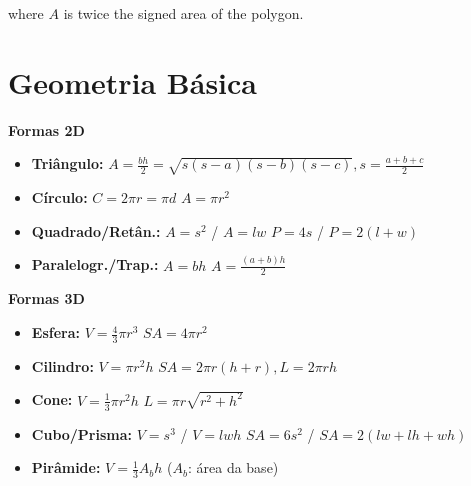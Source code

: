 where $A$ is twice the signed area of the polygon.

\section{Geometria Básica}

\textbf{Formas 2D}
\begin{itemize}[leftmargin=*, nosep]
    \item \textbf{Triângulo:} $A = \frac{bh}{2} = \sqrt{s(s-a)(s-b)(s-c)}, s = \frac{a+b+c}{2}$
    \item \textbf{Círculo:} $C = 2\pi r = \pi d$ \hfill $A = \pi r^2$
    \item \textbf{Quadrado/Retân.:} $A = s^2$ / $A = lw$ \hfill $P = 4s$ / $P = 2(l+w)$
    \item \textbf{Paralelogr./Trap.:} $A = bh$ \hfill $A = \frac{(a+b)h}{2}$
\end{itemize}

\textbf{Formas 3D}
\begin{itemize}[leftmargin=*, nosep]
    \item \textbf{Esfera:} $V = \frac{4}{3}\pi r^3$ \hfill $SA = 4\pi r^2$
    \item \textbf{Cilindro:} $V = \pi r^2 h$ \hfill $SA = 2\pi r(h+r), L = 2\pi rh$
    \item \textbf{Cone:} $V = \frac{1}{3}\pi r^2 h$ \hfill $L = \pi r \sqrt{r^2+h^2}$
    \item \textbf{Cubo/Prisma:} $V = s^3$ / $V = lwh$ \hfill $SA = 6s^2$ / $SA = 2(lw+lh+wh)$
    \item \textbf{Pirâmide:} $V = \frac{1}{3} A_b h$ ($A_b$: área da base)
\end{itemize}
